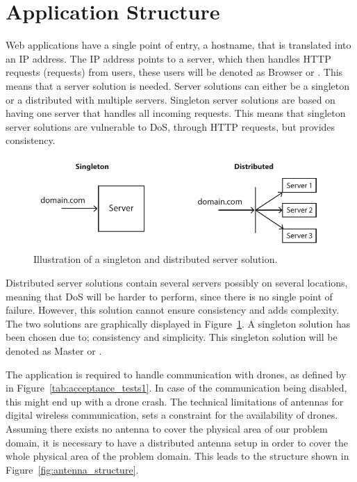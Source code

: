 \section{Application Structure}
\label{sec:application_structure}

Web applications have a single point of entry, a hostname, that is translated into an IP address.
The IP address points to a server, which then handles HTTP requests (requests) from users, these users will be denoted as Browser or .
This means that a server solution is needed.
Server solutions can either be a singleton or a distributed with multiple servers.
Singleton server solutions are based on having one server that handles all incoming requests.
This means that singleton server solutions are vulnerable to DoS, through HTTP requests, but provides consistency.

\begin{figure}[htb]
    \centering
    \includegraphics[width=\textwidth]{gfx/server_solutions.pdf}
    \caption{Illustration of a singleton and distributed server solution.}
    \label{fig:server_solutions}
\end{figure}

Distributed server solutions contain several servers possibly on several locations, meaning that DoS will be harder to perform, since there is no single point of failure.
However, this solution cannot ensure consistency and adds complexity.
The two solutions are graphically displayed in Figure~\ref{fig:server_solutions}.
A singleton solution has been chosen due to; consistency and simplicity.
This singleton solution will be denoted as Master or .

The application is required to handle communication with drones, as defined by  in Figure~\ref{tab:acceptance_tests1}.
In case of the communication being disabled, this might end up with a drone crash.
The technical limitations of antennas for digital wireless communication, sets a constraint for the availability of drones.
Assuming there exists no antenna to cover the physical area of our problem domain, it is necessary to have a distributed antenna setup in order to cover the whole physical area of the problem domain.
This leads to the structure shown in Figure~\ref{fig:antenna_structure}.

